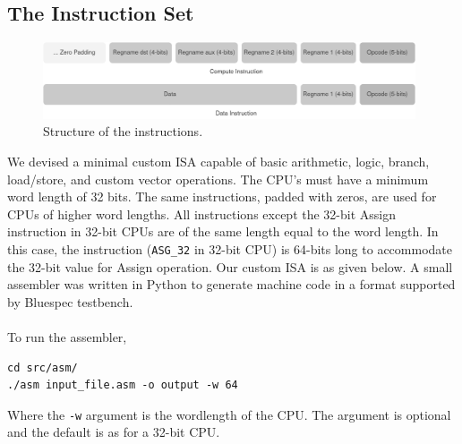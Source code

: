 \begin{paper}
\section*{The Instruction Set\sdot}
\begin{figure}[H]
\centering
\includegraphics[width=11cm]{Images/Overview-InstructionSet.png}
\caption{\content Structure of the instructions.}
\end{figure}
We devised a minimal custom ISA capable of basic arithmetic, logic, branch, load/store, and custom vector operations. The CPU's must have a minimum word length of 32 bits. The same instructions, padded with zeros, are used for CPUs of higher word lengths. All instructions except the 32-bit Assign instruction in 32-bit CPUs are of the same length equal to the word length. In this case, the instruction (\texttt{ASG\_32} in 32-bit CPU) is 64-bits long to accommodate the 32-bit value for Assign operation. Our custom ISA is as given below. A small assembler was written in Python to generate machine code in a format supported by Bluespec testbench.\\\\
\nointend To run the assembler,
\begin{verbatim}
cd src/asm/
./asm input_file.asm -o output -w 64
\end{verbatim}
\nointend Where the \texttt{-w} argument is the wordlength of the CPU. The argument is optional and the default is as for a 32-bit CPU.



\end{paper}
